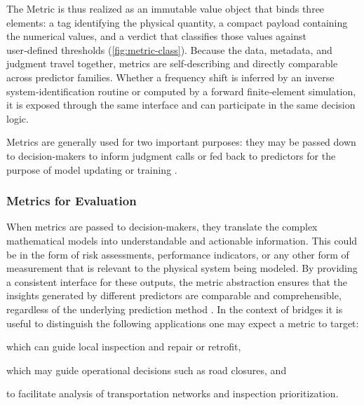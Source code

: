 The Metric is thus realized as an immutable value object that binds three elements: a tag identifying the physical quantity, a compact payload containing the numerical values, and a verdict that classifies those values against user‑defined thresholds (\cref{fig:metric-class}).  
Because the data, metadata, and judgment travel together, metrics are self‑describing and directly comparable across predictor families.  Whether a frequency shift is inferred by an inverse system‑identification routine or computed by a forward finite‑element simulation, it is exposed through the same interface and can participate in the same decision logic.

Metrics are generally used for two important purposes: they may be passed down to decision-makers to inform judgment calls or fed back to \glspl{predictor} for the purpose of model updating or training \citep{katam2023review,avci2021review}. 

\subsubsection{Metrics for Evaluation}
When metrics are passed to decision-makers, they translate the complex mathematical models into understandable and actionable information. This could be in the form of risk assessments, performance indicators, or any other form of measurement that is relevant to the physical system being modeled. 
By providing a consistent interface for these outputs, the \gls{metric} abstraction ensures that the insights generated by different \glspl{predictor} are comparable and comprehensible, regardless of the underlying prediction method \citep{doebling1998summary,salawu1997detection,dilorenzo2023physics,muin2024human}.
%
\iffalse
In the context of bridges 
it is useful to distinguish the following applications one may expect a metric to target:

\begin{description}[noitemsep]
    \item [Component condition] which can guide local inspection and repair or retrofit,
    \item [Structure condition] which may guide operational decisions such as road closures, and
    \item [Inventory condition] 
       to facilitate analysis of transportation networks and inspection prioritization.
\end{description}

